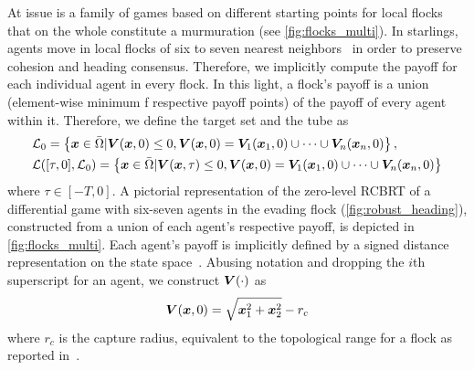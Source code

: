%
At issue is a family of games based on different starting points for local flocks that on the whole constitute a murmuration (see \autoref{fig:flocks_multi}). 
In starlings, agents move in local flocks of six to seven nearest neighbors~\cite{Ballerini1232} in order to preserve cohesion and heading consensus.  Therefore, we implicitly compute the payoff for each individual agent in every flock. In this light, a flock's payoff is a union (element-wise minimum f respective payoff points) of the payoff of every agent within it.  %
%
Therefore, we define the target set and the tube as
%
\begin{align}
	&\mathcal{L}_0 = \left\{ \bm{x} \in \bar{\Omega} | \bm{V}(\bm{x}, 0) \le 0, \bm{V}(\bm{x}, 0) = \bm{V}_1(\bm{x}_1, 0) \cup \cdots \cup \bm{V}_n(\bm{x}_n, 0)\right\} , \\
	&\mathcal{L}([\tau, 0],  \mathcal{L}_0) = \left\{\bm{x}\in \bar{\Omega}  | \bm{V}(\bm{x}, \tau) \le 0, \bm{V}(\bm{x}, 0) = \bm{V}_1(\bm{x}_1, 0) \cup \cdots \cup \bm{V}_n(\bm{x}_n, 0)\right\} \nonumber
\end{align}
%
where $\tau \in  [-T, 0]$. A pictorial representation of the zero-level RCBRT of a differential  game with six-seven agents in the evading flock (\cf\autoref{fig:robust_heading}), constructed from a union of each agent's respective payoff,  is depicted in \autoref{fig:flocks_multi}. Each agent's payoff is implicitly defined by a signed distance representation on the state space~\cite{LevelSetsBook}. Abusing notation and dropping the $i$th superscript for an agent, we construct $\bm{V}(\cdot)$ as 
%
\begin{align}
	\bm{V}(\bm{x}, 0) = \sqrt{\bm{x}_1^2 + \bm{x}_2^2} - r_c
\end{align}
%
where $r_c$ is the capture radius, equivalent to the topological range for a flock as reported in~\cite{Ballerini1232}. 

